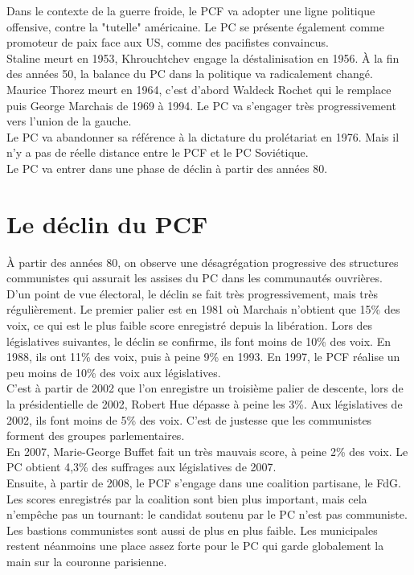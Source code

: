 \documentclass[10pt, a4paper, openany]{book}
\begin{document}
Dans le contexte de la guerre froide, le PCF va adopter une ligne politique offensive, contre la "tutelle" américaine. Le PC se présente également comme promoteur de paix face aux US, comme des pacifistes convaincus. \\
Staline meurt en 1953, Khrouchtchev engage la déstalinisation en 1956. À la fin des années 50, la balance du PC dans la politique va radicalement changé. \\
Maurice Thorez meurt en 1964, c'est d'abord Waldeck Rochet qui le remplace puis George Marchais de 1969 à 1994. Le PC va s'engager très progressivement vers l'union de la gauche. \\
Le PC va abandonner sa référence à la dictature du prolétariat en 1976. Mais il n'y a pas de réelle distance entre le PCF et le PC Soviétique. \\
Le PC va entrer dans une phase de déclin à partir des années 80. 

\section{Le déclin du PCF}

À partir des années 80, on observe une désagrégation progressive des structures communistes qui assurait les assises du PC dans les communautés ouvrières. \\
D'un point de vue électoral, le déclin se fait très progressivement, mais très régulièrement. Le premier palier est en 1981 où Marchais n'obtient que 15\% des voix, ce qui est le plus faible score enregistré depuis la libération. Lors des législatives suivantes, le déclin se confirme, ils font moins de 10\% des voix. En 1988, ils ont 11\% des voix, puis à peine 9\% en 1993. En 1997, le PCF réalise un peu moins de 10\% des voix aux législatives. \\
C'est à partir de 2002 que l'on enregistre un troisième palier de descente, lors de la présidentielle de 2002, Robert Hue dépasse à peine les 3\%. Aux législatives de 2002, ils font moins de 5\% des voix. C'est de justesse que les communistes forment des groupes parlementaires. \\
En 2007, Marie-George Buffet fait un très mauvais score, à peine 2\% des voix. Le PC obtient 4,3\% des suffrages aux législatives de 2007. \\
Ensuite, à partir de 2008, le PCF s'engage dans une coalition partisane, le FdG. Les scores enregistrés par la coalition sont bien plus important, mais cela n'empêche pas un tournant: le candidat soutenu par le PC n'est pas communiste. \\
Les bastions communistes sont aussi de plus en plus faible. Les municipales restent néanmoins une place assez forte pour le PC qui garde globalement la main sur la couronne parisienne. 
\end{document}
